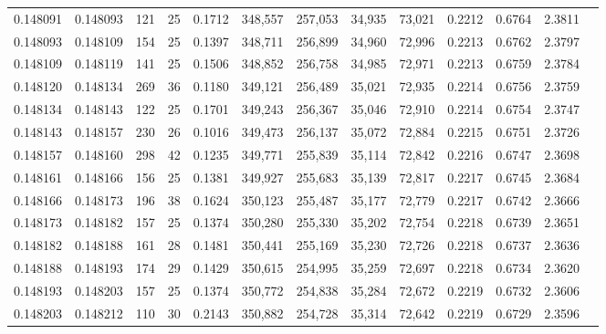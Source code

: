 \begin{tabular}{rrrrrrrrrrrrr}
0.148091 & 0.148093 & 121 &  25 &                                     0.1712 & 348,557 & 257,053 &  34,935 &  73,021 & 0.2212 & 0.6764 & 2.3811 \\
0.148093 & 0.148109 & 154 &  25 &                                     0.1397 & 348,711 & 256,899 &  34,960 &  72,996 & 0.2213 & 0.6762 & 2.3797 \\
0.148109 & 0.148119 & 141 &  25 &                                     0.1506 & 348,852 & 256,758 &  34,985 &  72,971 & 0.2213 & 0.6759 & 2.3784 \\
0.148120 & 0.148134 & 269 &  36 &                                     0.1180 & 349,121 & 256,489 &  35,021 &  72,935 & 0.2214 & 0.6756 & 2.3759 \\
0.148134 & 0.148143 & 122 &  25 &                                     0.1701 & 349,243 & 256,367 &  35,046 &  72,910 & 0.2214 & 0.6754 & 2.3747 \\
0.148143 & 0.148157 & 230 &  26 &                                     0.1016 & 349,473 & 256,137 &  35,072 &  72,884 & 0.2215 & 0.6751 & 2.3726 \\
0.148157 & 0.148160 & 298 &  42 &                                     0.1235 & 349,771 & 255,839 &  35,114 &  72,842 & 0.2216 & 0.6747 & 2.3698 \\
0.148161 & 0.148166 & 156 &  25 &                                     0.1381 & 349,927 & 255,683 &  35,139 &  72,817 & 0.2217 & 0.6745 & 2.3684 \\
0.148166 & 0.148173 & 196 &  38 &                                     0.1624 & 350,123 & 255,487 &  35,177 &  72,779 & 0.2217 & 0.6742 & 2.3666 \\
0.148173 & 0.148182 & 157 &  25 &                                     0.1374 & 350,280 & 255,330 &  35,202 &  72,754 & 0.2218 & 0.6739 & 2.3651 \\
0.148182 & 0.148188 & 161 &  28 &                                     0.1481 & 350,441 & 255,169 &  35,230 &  72,726 & 0.2218 & 0.6737 & 2.3636 \\
0.148188 & 0.148193 & 174 &  29 &                                     0.1429 & 350,615 & 254,995 &  35,259 &  72,697 & 0.2218 & 0.6734 & 2.3620 \\
0.148193 & 0.148203 & 157 &  25 &                                     0.1374 & 350,772 & 254,838 &  35,284 &  72,672 & 0.2219 & 0.6732 & 2.3606 \\
0.148203 & 0.148212 & 110 &  30 &                                     0.2143 & 350,882 & 254,728 &  35,314 &  72,642 & 0.2219 & 0.6729 & 2.3596 \\

\end{tabular}
